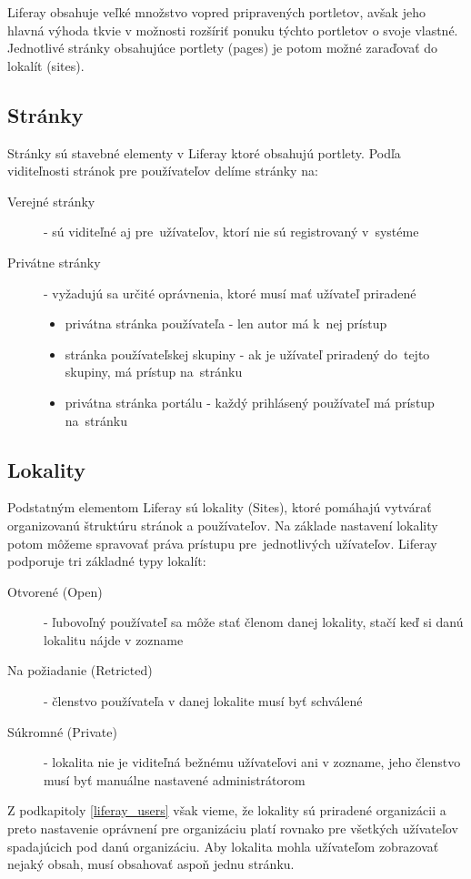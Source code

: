 \documentclass[
  printed, %
  twoside, %
  notable,   %
  nolof,   %
  nolot,   %
]{fithesis3}
\begin{document}
Liferay obsahuje veľké množstvo vopred pripravených portletov, avšak jeho hlavná výhoda tkvie v možnosti rozšíriť ponuku týchto portletov o svoje vlastné. Jednotlivé stránky obsahujúce portlety (pages) je potom možné zaraďovať do lokalít (sites).

\subsection{Stránky}
Stránky sú stavebné elementy v Liferay ktoré obsahujú portlety. Podľa viditeľnosti stránok pre používateľov delíme stránky na:
\begin{description}
\item[Verejné stránky] - sú viditeľné aj pre~užívateľov, ktorí nie sú registrovaný v~systéme
\item[Privátne stránky] - vyžadujú sa určité oprávnenia, ktoré musí mať užívateľ priradené
\begin{itemize}
\item privátna stránka používateľa - len autor má k~nej prístup
\item stránka používateľskej skupiny - ak je užívateľ priradený do~tejto skupiny, má prístup na~stránku
\item privátna stránka portálu - každý prihlásený používateľ má prístup na~stránku
\end{itemize}
\end{description}

\subsection{Lokality}
Podstatným elementom Liferay sú lokality (Sites), ktoré pomáhajú vytvárať organizovanú štruktúru stránok a používateľov. Na základe nastavení lokality potom môžeme spravovať práva prístupu pre~jednotlivých užívateľov. Liferay podporuje tri základné typy lokalít\cite{burska2016portlety}:
\begin{description}
\item[Otvorené (Open)] - ľubovoľný používateľ sa môže stať členom danej lokality, stačí keď si danú lokalitu nájde v zozname
\item[Na požiadanie (Retricted)] - členstvo používateľa v danej lokalite musí byť schválené
\item[Súkromné (Private)] - lokalita nie je viditeľná bežnému užívateľovi ani v zozname, jeho členstvo musí byť manuálne nastavené administrátorom
\end{description}
Z podkapitoly \ref{liferay_users} však vieme, že lokality sú priradené organizácii a preto nastavenie oprávnení pre organizáciu platí rovnako pre všetkých užívateľov spadajúcich pod danú organizáciu. Aby lokalita mohla užívateľom zobrazovať nejaký obsah, musí obsahovať aspoň jednu stránku.
\end{document}

